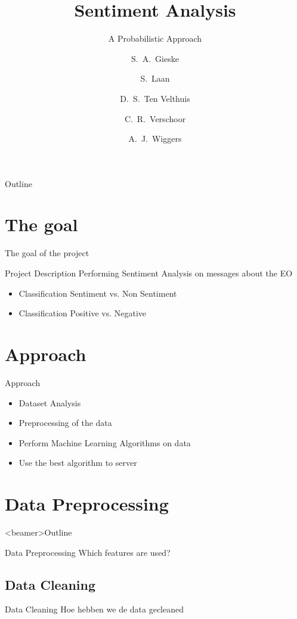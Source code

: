 \documentclass{beamer}
\title[Leren en Beslissen - Sentiment Analisys]
{Sentiment Analysis}
\subtitle{A Probabilistic Approach}
\author[Gieske, Laan, ten Velthuis, Verschoor, Wiggers ] %
{S.~A.~Gieske \and S.~Laan \and D.~S.~Ten Velthuis \and C.~R.~Verschoor \and A.~J.~Wiggers}
\institute[University of Amsterdam] %
{
  Faculty of Science (FNWI) \\
  University of Amsterdam
  }
\begin{document}
\begin{frame}
  \titlepage
\end{frame}

\begin{frame}{Outline}
  \setcounter{tocdepth}{1}
  \tableofcontents
\end{frame}


\section{The goal}

\begin{frame}{The goal of the project}
\begin{block}{Project Description}
Performing Sentiment Analysis on messages about the EO
\end{block}
\begin{itemize}
\item Classification Sentiment vs. Non Sentiment
\item Classification Positive vs. Negative
\end{itemize}
\end{frame}

\section{Approach}
\begin{frame}{Approach}
\begin{itemize}
\item Dataset Analysis
\item Preprocessing of the data
\item Perform Machine Learning Algorithms on data
\item Use the best algorithm to server
\end{itemize}
\end{frame}

\section{Data Preprocessing}
\begin{frame}<beamer>{Outline}
    \setcounter{tocdepth}{2}
    \tableofcontents[
    currentsubsection, 
    hideothersubsections, 
    sectionstyle=show/hide] 
  \end{frame}
\begin{frame}{Data Preprocessing}
Which features are used?
\end{frame}
\subsection{Data Cleaning}
\begin{frame}{Data Cleaning}
Hoe hebben we de data gecleaned
\end{frame}
\end{document}
